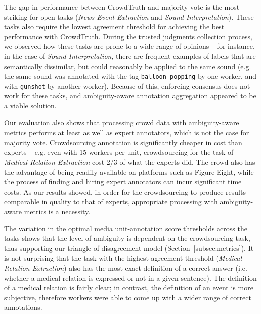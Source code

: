 The gap in performance between CrowdTruth and majority vote is the most striking for open tasks (\textit{News Event Extraction} and \textit{Sound Interpretation}).  These tasks also require the lowest agreement threshold for achieving the best performance with CrowdTruth.  During the trusted judgments collection process, we observed how these tasks are prone to a wide range of opinions -- for instance, in the case of \textit{Sound Interpretation}, there are frequent examples of labels that are semantically dissimilar, but could reasonably be applied to the same sound (e.g. the same sound was annotated with the tag \texttt{balloon popping} by one worker, and with \texttt{gunshot} by another worker).  Because of this, enforcing consensus does not work for these tasks, and ambiguity-aware annotation aggregation appeared to be a viable solution.

Our evaluation also shows that processing crowd data with ambiguity-aware metrics performs at least as well as expert annotators, which is not the case for majority vote.  Crowdsourcing annotation is significantly cheaper in cost than experts --  e.g. even with 15 workers per unit, crowdsourcing for the task of \textit{Medical Relation Extraction} cost 2/3 of what the experts did. The crowd also has the advantage of being readily available on platforms such as Figure Eight, while the process of finding and hiring expert annotators can incur significant time costs. As our results showed, in order for the crowdsourcing to produce results comparable in quality to that of experts, appropriate processing with ambiguity-aware metrics is a necessity.

The variation in the optimal media unit-annotation score thresholds across the tasks shows that the level of ambiguity is dependent on the crowdsourcing task, thus supporting our triangle of disagreement model (Section~\ref{subsec:metrics}).  It is not surprising that the task with the highest agreement threshold (\textit{Medical Relation Extraction}) also has the most exact definition of a correct answer (i.e. whether a medical relation is expressed or not in a given sentence).  The definition of a medical relation is fairly clear; in contrast, the definition of an event is more subjective, therefore workers were able to come up with a wider range of correct annotations.

